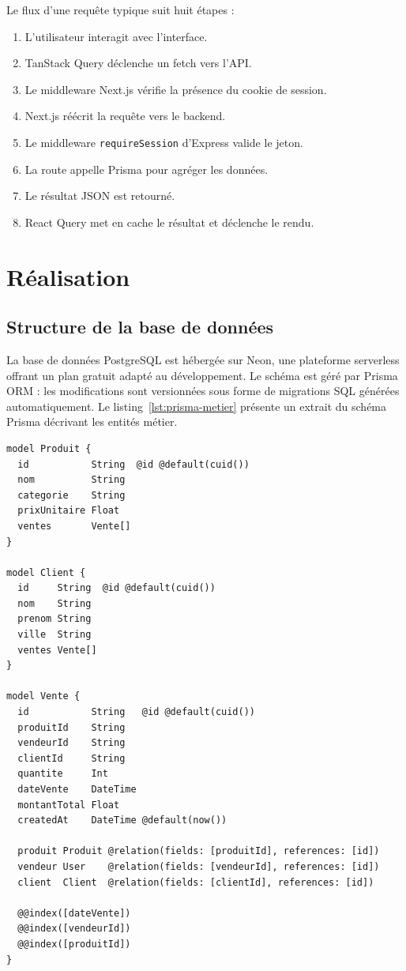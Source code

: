 \documentclass[11pt,a4paper]{report}
\begin{document}
Le flux d'une requête typique suit huit étapes :
\begin{enumerate}
  \item L'utilisateur interagit avec l'interface.
  \item TanStack Query déclenche un fetch vers l'API.
  \item Le middleware Next.js vérifie la présence du cookie de session.
  \item Next.js réécrit la requête vers le backend.
  \item Le middleware \texttt{requireSession} d'Express valide le jeton.
  \item La route appelle Prisma pour agréger les données.
  \item Le résultat JSON est retourné.
  \item React Query met en cache le résultat et déclenche le rendu.
\end{enumerate}

\chapter{Réalisation}

\section{Structure de la base de données}
La base de données PostgreSQL est hébergée sur Neon, une plateforme serverless
offrant un plan gratuit adapté au développement. Le schéma est géré par Prisma
ORM : les modifications sont versionnées sous forme de migrations SQL générées
automatiquement. Le listing~\ref{lst:prisma-metier} présente un extrait du
schéma Prisma décrivant les entités métier.

\begin{lstlisting}[caption={Schéma Prisma des entités métier (extrait de prisma/schema.prisma)},label={lst:prisma-metier}]
model Produit {
  id           String  @id @default(cuid())
  nom          String
  categorie    String
  prixUnitaire Float
  ventes       Vente[]
}

model Client {
  id     String  @id @default(cuid())
  nom    String
  prenom String
  ville  String
  ventes Vente[]
}

model Vente {
  id           String   @id @default(cuid())
  produitId    String
  vendeurId    String
  clientId     String
  quantite     Int
  dateVente    DateTime
  montantTotal Float
  createdAt    DateTime @default(now())

  produit Produit @relation(fields: [produitId], references: [id])
  vendeur User    @relation(fields: [vendeurId], references: [id])
  client  Client  @relation(fields: [clientId], references: [id])

  @@index([dateVente])
  @@index([vendeurId])
  @@index([produitId])
}
\end{lstlisting}
\end{document}

